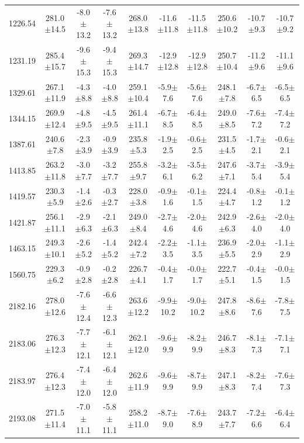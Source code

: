 \documentclass[agupp]{aguplus}              %
\begin{document}
\begin{article}
\begin{center}
\begin{table}[ht]
{\begin{tabular}{c|ccc|ccc|ccc}
1226.54 & 281.0$\pm$14.5 & -8.0$\pm$13.2 & -7.6$\pm$13.2 & 268.0$\pm$13.8 & -11.6$\pm$11.8 & -11.5$\pm$11.8 & 250.6$\pm$10.2 & -10.7$\pm$9.3 & -10.7$\pm$9.2 \\ 
1231.19 & 285.4$\pm$15.7 & -9.6$\pm$15.3 & -9.4$\pm$15.3 & 269.3$\pm$14.7 & -12.9$\pm$12.8 & -12.9$\pm$12.8 & 250.7$\pm$10.4 & -11.2$\pm$9.6 & -11.1$\pm$9.6 \\ 
\hline
1329.61 & 267.1$\pm$11.9 & -4.3$\pm$8.8 & -4.0$\pm$8.8 & 259.1$\pm$10.4 & -5.9$\pm$7.6 & -5.6$\pm$7.6 & 248.1$\pm$7.8 & -6.7$\pm$6.5 & -6.5$\pm$6.5 \\ 
1344.15 & 269.9$\pm$12.4 & -4.8$\pm$9.5 & -4.5$\pm$9.5 & 261.4$\pm$11.1 & -6.7$\pm$8.5 & -6.4$\pm$8.5 & 249.0$\pm$8.5 & -7.6$\pm$7.2 & -7.4$\pm$7.2 \\ 
1387.61 & 240.6$\pm$7.8 & -2.3$\pm$3.9 & -0.9$\pm$3.9 & 235.8$\pm$5.3 & -1.9$\pm$2.5 & -0.6$\pm$2.5 & 231.5$\pm$4.5 & -1.7$\pm$2.1 & -0.6$\pm$2.1 \\ 
1413.85 & 263.2$\pm$11.8 & -3.0$\pm$7.7 & -3.2$\pm$7.7 & 255.8$\pm$9.7 & -3.2$\pm$6.1 & -3.5$\pm$6.2 & 247.6$\pm$7.1 & -3.7$\pm$5.4 & -3.9$\pm$5.4 \\ 
1419.57 & 230.3$\pm$5.9 & -1.4$\pm$2.6 & -0.3$\pm$2.7 & 228.0$\pm$3.8 & -0.9$\pm$1.6 & -0.1$\pm$1.5 & 224.4$\pm$4.7 & -0.8$\pm$1.2 & -0.1$\pm$1.2 \\ 
1421.87 & 256.1$\pm$11.1 & -2.9$\pm$6.3 & -2.1$\pm$6.3 & 249.0$\pm$8.4 & -2.7$\pm$4.6 & -2.0$\pm$4.6 & 242.9$\pm$6.3 & -2.6$\pm$4.0 & -2.0$\pm$4.0 \\ 
1463.15 & 249.3$\pm$10.1 & -2.6$\pm$5.2 & -1.4$\pm$5.2 & 242.4$\pm$7.2 & -2.2$\pm$3.5 & -1.1$\pm$3.5 & 236.9$\pm$5.5 & -2.0$\pm$2.9 & -1.1$\pm$2.9 \\ 
1560.75 & 229.3$\pm$6.2 & -0.9$\pm$2.8 & -0.2$\pm$2.8 & 226.7$\pm$4.1 & -0.4$\pm$1.7 & -0.0$\pm$1.7 & 222.7$\pm$5.1 & -0.4$\pm$1.5 & -0.0$\pm$1.5 \\ 
\hline
2182.16 & 278.0$\pm$12.6 & -7.6$\pm$12.4 & -6.6$\pm$12.3 & 263.6$\pm$12.2 & -9.9$\pm$10.2 & -9.0$\pm$10.2 & 247.8$\pm$8.6 & -8.6$\pm$7.6 & -7.8$\pm$7.5 \\ 
2183.06 & 276.3$\pm$12.3 & -7.7$\pm$12.1 & -6.1$\pm$12.1 & 262.1$\pm$12.0 & -9.6$\pm$9.9 & -8.2$\pm$9.9 & 246.7$\pm$8.3 & -8.1$\pm$7.3 & -7.1$\pm$7.1 \\ 
2183.97 & 276.4$\pm$12.3 & -7.4$\pm$12.0 & -6.4$\pm$12.0 & 262.6$\pm$11.9 & -9.6$\pm$9.9 & -8.7$\pm$9.9 & 247.1$\pm$8.3 & -8.2$\pm$7.4 & -7.6$\pm$7.3 \\ 
2193.08 & 271.5$\pm$11.4 & -7.0$\pm$11.1 & -5.8$\pm$11.1 & 258.2$\pm$11.0 & -8.7$\pm$9.0 & -7.6$\pm$8.9 & 243.7$\pm$7.7 & -7.2$\pm$6.6 & -6.4$\pm$6.4 \\ 

\end{tabular}}
\end{table}
\end{center}
\end{article}
\end{document}
